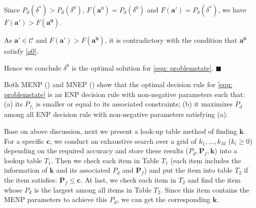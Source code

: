 Since $P_d(\delta^\ast) > P_d(\delta^0)$, $F(\mathbf{a}^0) = P_d(\delta^0)$ and  $F(\mathbf{a}') = P_d(\delta^\ast)$, we have $F(\mathbf{a'}) > F(\mathbf{a^0})$. 

As $\mathbf{a}' \in \mathcal{C}$ and $F(\mathbf{a'}) > F(\mathbf{a^0})$, it is contradictory with the condition that $\mathbf{a^0}$ satisfy \eqref{a0}.

Hence we conclude $\delta^0$ is the optimal solution for \eqref{equ: problemstate}. $\blacksquare$

Both MENP () and MNEP () show that the optimal decision rule for \eqref{equ: problemstate} is an ENP decision rule  with non-negative parameters such that: (a) its $P_{f_i}$ is smaller or equal to its associated constraints; (b) it maximizes $P_d$ among all ENP decision rule with non-negative parameters satisfying (a).

Base on above discussion, 
next we present a look-up table method of finding $\mathbf{k}$. For a specific $\mathbf{c}$, we conduct an exhaustive search over a grid of $k_1, ..., k_M$ ($k_i \geq 0$) depending on the required accuracy and store these results ($P_d, \mathbf{P}_f, \mathbf{k}$) into a lookup table $T_1$. 
Then we check each item in Table $T_1$ (each item includes the information of $\mathbf{k}$ and its associated $P_d$ and $\mathbf{P}_f$) and put the item into table $T_2$ if the item satisfies: $\mathbf{P}_f \leq \mathbf{c}$. At last, we check each item in $T_2$ and find the item whose $P_d$ is the largest among all items in Table $T_2$. Since this item contains the MENP parameters to achieve this $P_d$, we can get the corresponding $\mathbf{k}$. 


